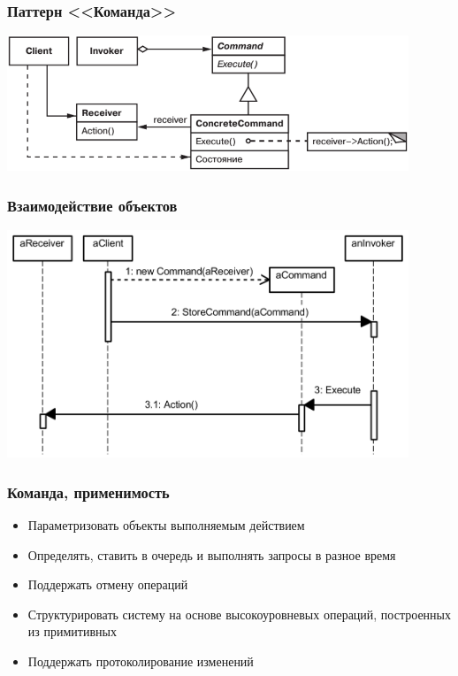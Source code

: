 \documentclass{../../slides-style}
\begin{document}
    \begin{frame}
        \frametitle{Паттерн <<Команда>>}
        \begin{center}
            \includegraphics[width=0.9\textwidth]{command.png}
        \end{center}
    \end{frame}

    \begin{frame}
        \frametitle{Взаимодействие объектов}
        \begin{center}
            \includegraphics[width=0.9\textwidth]{commandSequence.png}
        \end{center}
    \end{frame}

    \begin{frame}
        \frametitle{Команда, применимость}
        \begin{itemize}
            \item Параметризовать объекты выполняемым действием
            \item Определять, ставить в очередь и выполнять запросы в разное время
            \item Поддержать отмену операций
            \item Структурировать систему на основе высокоуровневых операций, построенных из примитивных
            \item Поддержать протоколирование изменений
        \end{itemize}
    \end{frame}
\end{document}
